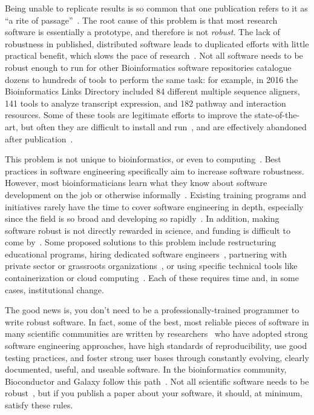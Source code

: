 \documentclass[10pt,letterpaper]{article}
\begin{document}
Being unable to
replicate results is so common that one publication refers to it as ``a rite of
passage''~\cite{baker2016}. 
The root cause of this problem is that most research software
is essentially a prototype, and therefore is not 
\emph{robust}. The lack of
robustness in published, distributed software
leads to duplicated efforts with little practical benefit,
which slows the pace of research~\cite{prabhu2011,lawlor2015}. 
Not all software needs to be robust enough to run for other 
Bioinformatics software repositories \cite{ison2016,brazas2012} catalogue dozens to
hundreds of tools to perform the same task:
for example,
in 2016 the Bioinformatics Links Directory included 84 different multiple sequence aligners, 141 tools
to analyze transcript expression, and 182 pathway and interaction resources.
Some of these tools are legitimate efforts to improve the state-of-the-art, but
often they are difficult to install and run~\cite{stajich2002,Seemann2013}, and are effectively abandoned
after publication~\cite{nekrutenko2012}.

This problem is not unique to bioinformatics, or even to computing~\cite{baker2016}. 
Best practices in software engineering specifically aim to increase software
robustness. However, most bioinformaticians learn what they know about software development
on the job or otherwise informally~\cite{prins2015,atwood2015}.
Existing training programs and initiatives rarely have the time to cover software engineering
in depth, especially since the field is so broad and developing so rapidly~\cite{atwood2015,lawlor2015}.
In addition, making software robust is not directly rewarded
in science, and funding is difficult to come by~\cite{prins2015}. Some proposed
solutions to this problem include restructuring educational programs,
hiring dedicated software engineers~\cite{lawlor2015,sanders2008},
partnering with private sector or grassroots organizations~\cite{prins2015,ison2016},
or using specific technical tools like containerization or cloud
computing~\cite{afgan2016,howe2012}. Each of these requires time and, in some
cases, institutional change.

The good news is,
you don't need to be a professionally-trained programmer to write robust software.
In fact,
some of the best, most reliable pieces of software in many scientific
communities are written by researchers~\cite{prabhu2011,sanders2008}
who have adopted strong software
engineering approaches, have high standards of reproducibility, use good testing
practices, and foster strong user
bases through constantly evolving, clearly documented, useful, and useable software.
In the bioinformatics community, Bioconductor and Galaxy follow this
path~\cite{gentleman2004,afgan2016}.
Not all scientific software needs to be robust~\cite{varoquaux2015}, but if you
publish a paper about your software, it should, at minimum, satisfy these
rules.
\end{document}
